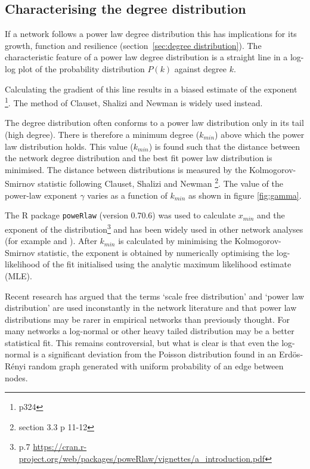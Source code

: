 \subsection{Characterising the degree distribution}
\label{sec: Methods degree distribution}
If a network follows a power law degree distribution this has implications for its growth, function and resilience (section~\ref{sec:degree distribution}). The characteristic feature of a power law degree distribution is a straight line in a log-log plot of the probability distribution $ P(k)$ against degree $k$.

 Calculating the gradient of this line results in a biased estimate of the exponent  \cite{newman2018networks}\footnote{p324}. The method of Clauset, Shalizi and Newman is widely used instead\cite{clauset2009power}.

The  degree distribution often conforms to a power law distribution only in its tail (high degree)\cite{newman2018networks}. There is therefore a minimum degree ($k_{min}$) above which the power law distribution holds. 
This value ($k_{min}$) is found such that the distance between the network degree distribution and the best fit power law distribution is minimised. The distance between distributions is measured by the Kolmogorov-Smirnov statistic following Clauset, Shalizi and Newman \cite{clauset2009power}\footnote{section 3.3 p 11-12}. The value of the power-law exponent $\gamma$ varies as a function of $k_{min}$ as shown in figure \ref{fig:gamma}.

The R package \texttt{poweRlaw} (version 0.70.6)\cite{gillespie2015fitting} was used to calculate $x_{min}$ and the exponent of the distribution\footnote{p.7 \url{https://cran.r-project.org/web/packages/poweRlaw/vignettes/a_introduction.pdf}} and has been widely used in other network analyses (for example\cite{wood2014defining} and \cite{miho2019large}). After $k_{min}$ is calculated by minimising the Kolmogorov-Smirnov statistic, the exponent is obtained by numerically optimising the log-likelihood of the fit initialised using the analytic maximum likelihood estimate (MLE)\cite{gillespie2015fitting}.

Recent research has argued that the terms `scale free distribution' and `power law distribution' are used inconstantly in the network literature and that power law distributions may be rarer in empirical networks than previously thought. For many networks a log-normal or other heavy tailed distribution may be a better statistical fit\cite{broido2019scale}. This remains controversial\cite{holme2019rare}, but what is clear is that even the log-normal is a significant deviation from the Poisson distribution found in an Erd{\"o}s-R{\'e}nyi random graph generated with uniform probability of an edge between nodes. 



